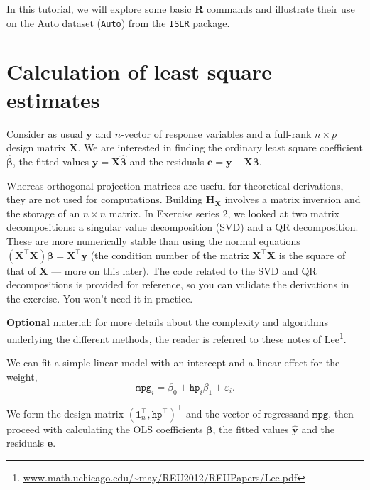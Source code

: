 \documentclass[]{book}
\let\rmarkdownfootnote\footnote%
\def\footnote{\protect\rmarkdownfootnote}
\renewcommand{\href}[2]{#2\footnote{\url{#1}}}
\theoremstyle{definition}
\theoremstyle{definition}
\theoremstyle{definition}
\theoremstyle{remark}
\begin{document}
In this tutorial, we will explore some basic \textbf{R} commands and illustrate their use on the Auto dataset (\texttt{Auto}) from the \texttt{ISLR} package.

\hypertarget{calculation-of-least-square-estimates}{%
\section{Calculation of least square estimates}\label{calculation-of-least-square-estimates}}

Consider as usual \(\boldsymbol{y}\) and \(n\)-vector of response variables and a full-rank \(n \times p\) design matrix \(\mathbf{X}\). We are interested in finding the ordinary least square coefficient \(\hat{\boldsymbol{\beta}}\), the fitted values \(\hat{\boldsymbol{y}} = \mathbf{X}\hat{\boldsymbol{\beta}}\) and the residuals \(\boldsymbol{e} = \boldsymbol{y} - \mathbf{X}\boldsymbol{\beta}\).

Whereas orthogonal projection matrices are useful for theoretical derivations, they are not used for computations. Building \(\mathbf{H}_{\mathbf{X}}\) involves a matrix inversion and the storage of an \(n \times n\) matrix. In Exercise series 2, we looked at two matrix decompositions: a singular value decomposition (SVD) and a QR decomposition. These are more numerically stable than using the normal equations \((\mathbf{X}^\top\mathbf{X})\boldsymbol{\beta} = \mathbf{X}^\top\boldsymbol{y}\) (the condition number of the matrix \(\mathbf{X}^\top\mathbf{X}\) is the square of that of \(\mathbf{X}\) --- more on this later).
The code related to the SVD and QR decompositions is provided for reference, so you can validate the derivations in the exercise. You won't need it in practice.

\textbf{Optional} material: for more details about the complexity and algorithms underlying the different methods, the reader is referred to these notes of \href{www.math.uchicago.edu/~may/REU2012/REUPapers/Lee.pdf}{Lee}.

We can fit a simple linear model with an intercept and a linear effect for the weight,
\[ \texttt{mpg}_i = \beta_0 + \texttt{hp}_i\beta_1 +\varepsilon_i.\]

We form the design matrix \((\boldsymbol{1}_n^\top, \texttt{hp}^\top)^\top\) and the vector of regressand \(\texttt{mpg}\), then proceed with calculating the OLS coefficients \(\hat{\boldsymbol{\beta}}\), the fitted values \(\hat{\boldsymbol{y}}\) and the residuals \(\boldsymbol{e}\).
\end{document}
